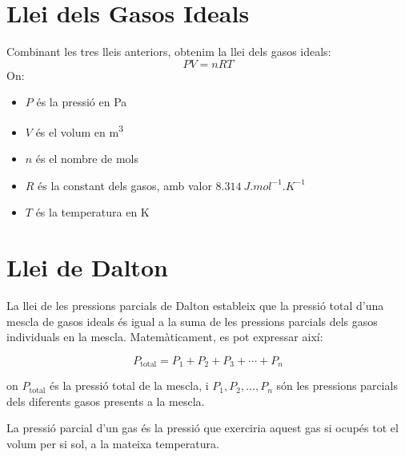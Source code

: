 \section{Llei dels Gasos Ideals}
Combinant les tres lleis anteriors, obtenim la llei dels gasos ideals:
\begin{equation}
    P V = n R T
\end{equation}
On:
\begin{itemize}
    \item \( P \) és la pressió en \si{Pa}
    \item \( V \) és el volum en \si{m^3}
    \item \( n \) és el nombre de mols
    \item \( R \) és la constant dels gasos, amb valor \( \SI{8.314}{J.mol^{-1}.K^{-1}} \)
    \item \( T \) és la temperatura en \si{K}
\end{itemize}

\section{Llei de Dalton}
La llei de les pressions parcials de Dalton estableix que la pressió total d'una mescla de gasos ideals és igual a la suma de les pressions parcials dels gasos individuals en la mescla. Matemàticament, es pot expressar així:

\[
P_{\text{total}} = P_1 + P_2 + P_3 + \cdots + P_n
\]

on \(P_{\text{total}}\) és la pressió total de la mescla, i \(P_1, P_2, \dots, P_n\) són les pressions parcials dels diferents gasos presents a la mescla.

La pressió parcial d'un gas és la pressió que exerciria aquest gas si ocupés tot el volum per si sol, a la mateixa temperatura.



